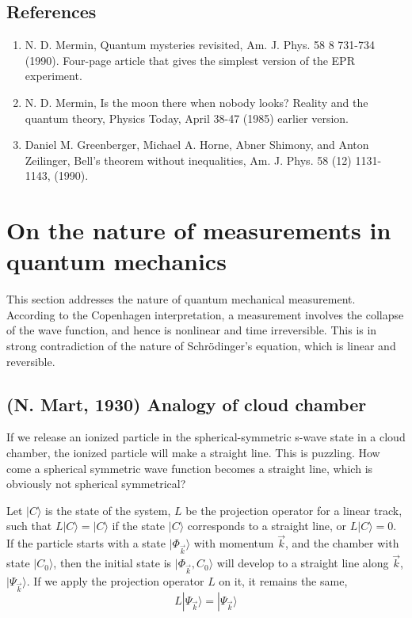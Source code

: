 \documentclass{article}
\begin{document}
\subsection{References}

\begin{enumerate}
\item N. D. Mermin, Quantum mysteries revisited, Am. J. Phys. 58 8 731-734 (1990).  Four-page article that gives the simplest version of the EPR experiment.
\item N. D. Mermin, Is the moon there when nobody looks? Reality and the quantum theory, Physics Today, April 38-47 (1985)  earlier version.
\item Daniel M. Greenberger, Michael A. Horne, Abner Shimony, and Anton Zeilinger, Bell's theorem without inequalities, Am. J. Phys. 58 (12) 1131-1143, (1990).
\end{enumerate}

\section{On the nature of measurements in quantum mechanics}

This section addresses the nature of quantum mechanical measurement.
According to the Copenhagen interpretation,
a measurement involves the collapse of the wave function,
and hence is nonlinear and time irreversible.
This is in strong contradiction of the nature of Schr\"odinger's equation,
which is linear and reversible.

\subsection{(N. Mart, 1930) Analogy of cloud chamber}

If we release an ionized particle in the spherical-symmetric s-wave state in a cloud chamber, the ionized particle will make a straight line.  This is puzzling.  How come a spherical symmetric wave function becomes a straight line, which is obviously not spherical symmetrical?

Let $|C\rangle$ is the state of the system, $L$ be the projection operator for a linear track, such that $L | C \rangle = | C \rangle$ if the state $|C\rangle$ corresponds to a straight line, or $L|C \rangle = 0$.  If the particle starts with a state $|\Phi_{\vec k}\rangle$ with momentum $\vec k$, and the chamber with state $| C_0\rangle$, then the initial state is $| \Phi_{\vec k}, C_0 \rangle$ will develop to a straight line along $\vec k$, $| \Psi_{\vec k} \rangle$. If we apply the projection operator $L$ on it, it remains the same,
$$
L| \Psi_{\vec k} \rangle = | \Psi_{\vec k} \rangle
$$
\end{document}
